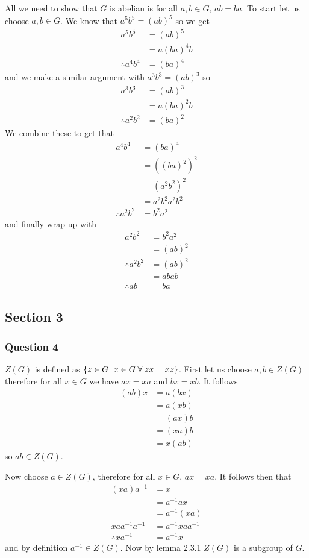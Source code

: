\documentclass{article}
\begin{document}
All we need to show that $G$ is abelian is for all $a,b \in G$, $ab = ba$. To start let us choose $a,b \in G$. We know that $a^5b^5 = (ab)^5$ so we get
\begin{align*}
a^5b^5 &= (ab)^5 \\
&= a(ba)^4b \\
\therefore a^4b^4 &= (ba)^4
\end{align*}
and we make a similar argument with $a^3b^3 = (ab)^3$ so
\begin{align*}
a^3b^3 &= (ab)^3 \\
&= a(ba)^2b \\
\therefore a^2b^2 &= (ba)^2
\end{align*}
We combine these to get that
\begin{align*}
a^4b^4 &= (ba)^4\\
 &= \left((ba)^2\right)^2 \\
 &= \left(a^2b^2\right)^2 \\
 &= a^2b^2a^2b^2 \\
 \therefore a^2b^2 &= b^2a^2
\end{align*}
 and finally wrap up with
 \begin{align*}
 a^2b^2&= b^2a^2 \\
 &= (ab)^2 \\
 \therefore a^2b^2 &= (ab)^2 \\
 &= abab \\
 \therefore ab &= ba
 \end{align*}
 
 
\subsection{Section 3}
\subsubsection{Question 4}\label{sec:question-4}
$Z(G)$ is defined as $\left\{{z\in G} \,\middle|\, {x\in G \; \forall\; {zx=xz}}\right\}$. First let us choose $a,b\in Z(G)$ therefore for all $x \in G$ we have $ax = xa$ and $bx = xb$. It follows
\begin{align*}
(ab)x &= a(bx) \\
&= a(xb) \\
&= (ax)b \\
&= (xa)b \\
&= x(ab)
\end{align*}
so $ab \in Z(G)$.

Now choose $a\in Z(G)$, therefore for all $x\in G$, $ax = xa$. It follows then that
\begin{align*}
(xa)a^{-1} &= x \\
&= a^{-1}ax \\
&= a^{-1}(xa) \\
xaa^{-1}a^{-1} &= a^{-1}xaa^{-1} \\
\therefore xa^{-1} &= a^{-1}x
\end{align*}
and by definition $a^{-1} \in Z(G)$. Now by lemma 2.3.1 $Z(G)$ is a subgroup of $G$.
\end{document}
